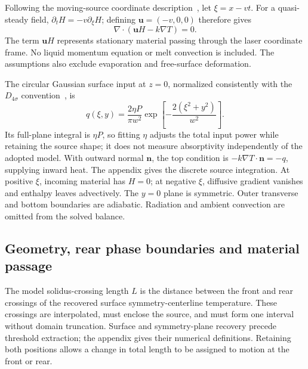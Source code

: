 Following the moving-source coordinate description~\cite{vanelsen2007}, let $\xi=x-vt$. For a quasi-steady field, $\partial_tH=-v\partial_\xi H$; defining $\bm u=(-v,0,0)$ therefore gives
\begin{equation}
 \nabla\cdot(\bm uH-k\nabla T)=0.
 \label{eq:frame}
\end{equation}
The term $\bm uH$ represents stationary material passing through the laser coordinate frame. No liquid momentum equation or melt convection is included. The assumptions also exclude evaporation and free-surface deformation.

The circular Gaussian surface input at $z=0$, normalized consistently with the $D_{4\sigma}$ convention~\cite{dynamic2024}, is
\begin{equation}
 q(\xi,y)=\frac{2\eta P}{\pi w^2}
 \exp\!\left[-\frac{2(\xi^2+y^2)}{w^2}\right].
 \label{eq:source}
\end{equation}
Its full-plane integral is $\eta P$, so fitting $\eta$ adjusts the total input power while retaining the source shape; it does not measure absorptivity independently of the adopted model. With outward normal $\bm n$, the top condition is $-k\nabla T\cdot\bm n=-q$, supplying inward heat. The appendix gives the discrete source integration. At positive $\xi$, incoming material has $H=0$; at negative $\xi$, diffusive gradient vanishes and enthalpy leaves advectively. The $y=0$ plane is symmetric. Outer transverse and bottom boundaries are adiabatic. Radiation and ambient convection are omitted from the solved balance.

\subsection{Geometry, rear phase boundaries and material passage}
\label{sec:geometry-passage}
The model solidus-crossing length $L$ is the distance between the front and rear crossings of the recovered surface symmetry-centerline temperature. These crossings are interpolated, must enclose the source, and must form one interval without domain truncation. Surface and symmetry-plane recovery precede threshold extraction; the appendix gives their numerical definitions. Retaining both positions allows a change in total length to be assigned to motion at the front or rear.

